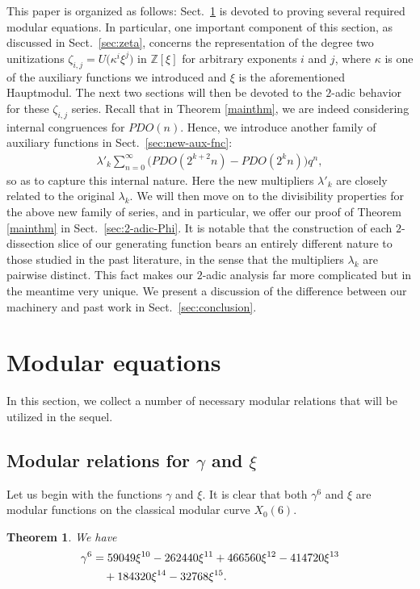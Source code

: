 \documentclass[12pt,reqno]{amsart}
\numberwithin{equation}{section}
\theoremstyle{theorem}
\newtheorem{theorem}{Theorem}
\theoremstyle{definition}
\begin{document}
This paper is organized as follows: Sect.~\ref{sec:mod-eqn} is devoted to proving several required modular equations. In particular, one important component of this section, as discussed in Sect.~\ref{sec:zeta}, concerns the representation of the degree two unitizations $\zeta_{i,j}=U\big(\kappa^i \xi^j\big)$ in $\mathbb{Z}[\xi]$ for arbitrary exponents $i$ and $j$, where $\kappa$ is one of the auxiliary functions we introduced and $\xi$ is the aforementioned Hauptmodul. The next two sections will then be devoted to the $2$-adic behavior for these $\zeta_{i,j}$ series. Recall that in Theorem \ref{mainthm}, we are indeed considering internal congruences for $PDO(n)$. Hence, we introduce another family of auxiliary functions in Sect.~\ref{sec:new-aux-fnc}:
\begin{align*}
    \lambda'_k \sum_{n=0}^\infty \big(PDO(2^{k+2} n)-PDO(2^k n)\big)q^n,
\end{align*}
so as to capture this internal nature. Here the new multipliers $\lambda'_k$ are closely related to the original $\lambda_k$. We will then move on to the divisibility properties for the above new family of series, and in particular, we offer our proof of Theorem \ref{mainthm} in Sect.~\ref{sec:2-adic-Phi}. It is notable that the construction of each $2$-dissection slice of our generating function bears an entirely different nature to those studied in the past literature, in the sense that the multipliers $\lambda_k$ are pairwise distinct. This fact makes our $2$-adic analysis far more complicated but in the meantime very unique. We present a discussion of the difference between our machinery and past work in Sect.~\ref{sec:conclusion}.

\section{Modular equations}\label{sec:mod-eqn}

In this section, we collect a number of necessary modular relations that will be utilized in the sequel.

\subsection{Modular relations for $\gamma$ and $\xi$}

Let us begin with the functions $\gamma$ and $\xi$. It is clear that both $\gamma^6$ and $\xi$ are modular functions on the classical modular curve $X_0(6)$.

\begin{theorem}\label{th:gamma6-xi-identity}
	We have
	\begin{align}\label{eq:gamma6-xi-identity}
		\gamma^6 &= 59049 \xi^{10} - 262440 \xi^{11} + 466560 \xi^{12} - 414720 \xi^{13}\notag\\
		&\quad + 184320 \xi^{14} - 32768 \xi^{15} .
	\end{align}
\end{theorem}
\end{document}
